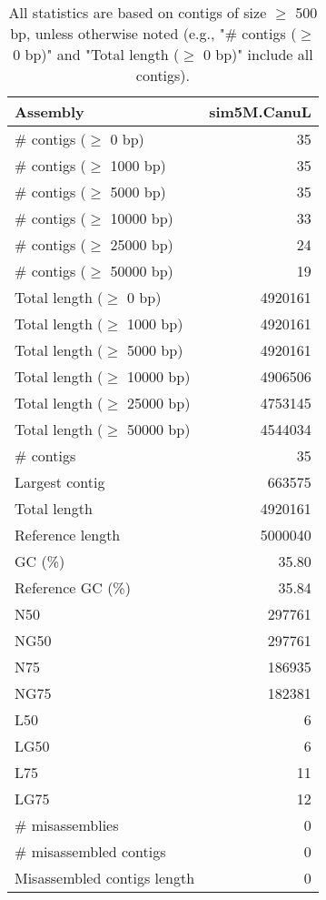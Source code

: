 \documentclass[12pt,a4paper]{article}
\begin{document}
\begin{table}[ht]
\begin{center}
\caption{All statistics are based on contigs of size $\geq$ 500 bp, unless otherwise noted (e.g., "\# contigs ($\geq$ 0 bp)" and "Total length ($\geq$ 0 bp)" include all contigs).}
\begin{tabular}{|l*{1}{|r}|}
\hline
Assembly & sim5M.CanuL \\ \hline
\# contigs ($\geq$ 0 bp) & 35 \\ \hline
\# contigs ($\geq$ 1000 bp) & 35 \\ \hline
\# contigs ($\geq$ 5000 bp) & 35 \\ \hline
\# contigs ($\geq$ 10000 bp) & 33 \\ \hline
\# contigs ($\geq$ 25000 bp) & 24 \\ \hline
\# contigs ($\geq$ 50000 bp) & 19 \\ \hline
Total length ($\geq$ 0 bp) & 4920161 \\ \hline
Total length ($\geq$ 1000 bp) & 4920161 \\ \hline
Total length ($\geq$ 5000 bp) & 4920161 \\ \hline
Total length ($\geq$ 10000 bp) & 4906506 \\ \hline
Total length ($\geq$ 25000 bp) & 4753145 \\ \hline
Total length ($\geq$ 50000 bp) & 4544034 \\ \hline
\# contigs & 35 \\ \hline
Largest contig & 663575 \\ \hline
Total length & 4920161 \\ \hline
Reference length & 5000040 \\ \hline
GC (\%) & 35.80 \\ \hline
Reference GC (\%) & 35.84 \\ \hline
N50 & 297761 \\ \hline
NG50 & 297761 \\ \hline
N75 & 186935 \\ \hline
NG75 & 182381 \\ \hline
L50 & 6 \\ \hline
LG50 & 6 \\ \hline
L75 & 11 \\ \hline
LG75 & 12 \\ \hline
\# misassemblies & 0 \\ \hline
\# misassembled contigs & 0 \\ \hline
Misassembled contigs length & 0 \\ \hline

\end{tabular}
\end{center}
\end{table}
\end{document}
